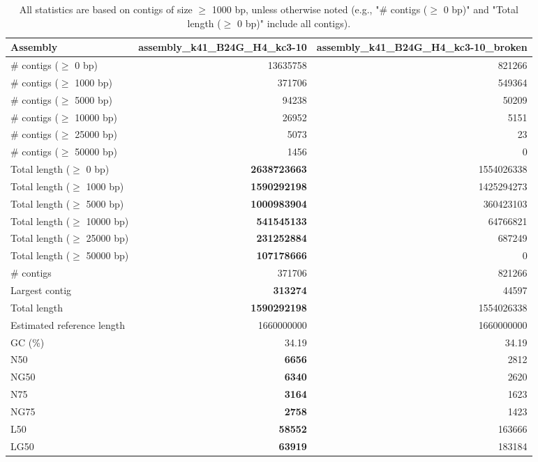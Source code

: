 \documentclass[12pt,a4paper]{article}
\begin{document}
\begin{table}[ht]
\begin{center}
\caption{All statistics are based on contigs of size $\geq$ 1000 bp, unless otherwise noted (e.g., "\# contigs ($\geq$ 0 bp)" and "Total length ($\geq$ 0 bp)" include all contigs).}
\begin{tabular}{|l*{2}{|r}|}
\hline
Assembly & assembly\_k41\_B24G\_H4\_kc3-10 & assembly\_k41\_B24G\_H4\_kc3-10\_broken \\ \hline
\# contigs ($\geq$ 0 bp) & 13635758 & 821266 \\ \hline
\# contigs ($\geq$ 1000 bp) & 371706 & 549364 \\ \hline
\# contigs ($\geq$ 5000 bp) & 94238 & 50209 \\ \hline
\# contigs ($\geq$ 10000 bp) & 26952 & 5151 \\ \hline
\# contigs ($\geq$ 25000 bp) & 5073 & 23 \\ \hline
\# contigs ($\geq$ 50000 bp) & 1456 & 0 \\ \hline
Total length ($\geq$ 0 bp) & {\bf 2638723663} & 1554026338 \\ \hline
Total length ($\geq$ 1000 bp) & {\bf 1590292198} & 1425294273 \\ \hline
Total length ($\geq$ 5000 bp) & {\bf 1000983904} & 360423103 \\ \hline
Total length ($\geq$ 10000 bp) & {\bf 541545133} & 64766821 \\ \hline
Total length ($\geq$ 25000 bp) & {\bf 231252884} & 687249 \\ \hline
Total length ($\geq$ 50000 bp) & {\bf 107178666} & 0 \\ \hline
\# contigs & 371706 & 821266 \\ \hline
Largest contig & {\bf 313274} & 44597 \\ \hline
Total length & {\bf 1590292198} & 1554026338 \\ \hline
Estimated reference length & 1660000000 & 1660000000 \\ \hline
GC (\%) & 34.19 & 34.19 \\ \hline
N50 & {\bf 6656} & 2812 \\ \hline
NG50 & {\bf 6340} & 2620 \\ \hline
N75 & {\bf 3164} & 1623 \\ \hline
NG75 & {\bf 2758} & 1423 \\ \hline
L50 & {\bf 58552} & 163666 \\ \hline
LG50 & {\bf 63919} & 183184 \\ \hline

\end{tabular}
\end{center}
\end{table}
\end{document}
